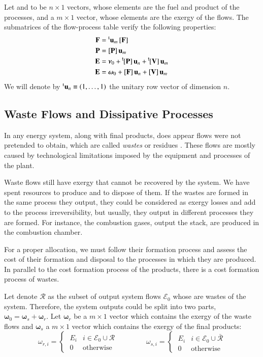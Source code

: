 \documentclass{ecos2018}
\begin{document}
Let  and  to be $n\times1$ vectors, whose elements are the fuel and product of the processes, and  a $m\times1$ vector, whose elements are the exergy of the flows.
The submatrices of the flow-process table verify the following properties:
\begin{align}
\mathbf{F}&=\prescript{\smash{\mathrm{t}}}{}{\mathbf{u}}_m\,[\mathbf{F}] \\
\mathbf{P}&=[\mathbf{P}]\,\mathbf{u}_m \\
\mathbf{E}&=\bm{\nu}_0 + \prescript{\smash{\mathsf{t}}}{}{\mskip-1mu}[\mathbf{P}]\,\mathbf{u}_n + \prescript{\smash{\mathsf{t}}}{}{\mskip-1mu}[\mathbf{V}]\,\mathbf{u}_m \\
\mathbf{E}&=\bm{\omega}_0 + [\mathbf{F}]\,\mathbf{u}_n + [\mathbf{V}]\,\mathbf{u}_m
\end{align}
We will denote by $\prescript{\smash{\mathrm{t}}}{}{\mathbf{u}}_n\equiv(1,\ldots,1)$ the unitary row vector of dimension $n$.

\subsection{Waste Flows and Dissipative Processes}
In any energy system, along with final products, does appear flows were not pretended to obtain, which are called \emph{wastes} or residues \cite{Agudelo12}. These flows are mostly caused by technological limitations imposed by the equipment and processes of the plant.

Waste flows still have exergy that cannot be recovered by the system. We have spent resources to produce and to dispose of them. If the wastes are formed in the same process they output, they could be considered as exergy losses and add to the process irreversibility, but usually, they output in different processes they are formed. For instance, the combustion gases, output the stack, are produced in the combustion chamber.

For a proper allocation, we must follow their formation process and assess the cost of their formation and disposal to the processes in which they are produced. In parallel to the cost formation process of the products, there is a cost formation process of wastes.

Let denote $\mathcal{R}$ as the subset of output system flows $\mathcal{E}_0$ whose are wastes of the system. Therefore, the system outputs could be split into two parts, $\bm{\omega}_0=\bm{\omega}_s+\bm{\omega}_r$.
Let $\bm{\omega}_r$ be a  $m \times 1$ vector which contains the exergy of the waste flows and $\bm{\omega}_s$ a $m \times 1$ vector which contains the exergy of the final products:
\begin{equation}
\omega_{r,i}=\begin{cases}
\;E_i&i\in \mathcal{E}_0\cup\mathcal{R} \\
\;0 & \text{otherwise}
\end{cases}
\qquad \qquad
\omega_{s,i}=\begin{cases}
	\;E_i&i\in \mathcal{E}_0\cup\bar{\mathcal{R}} \\
	\;0 & \text{otherwise}
\end{cases}
\end{equation}
\end{document}
